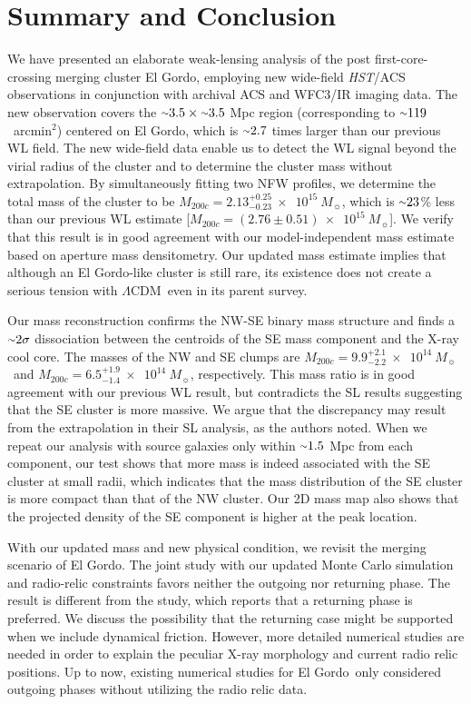 \documentclass[twocolumn]{aastex631}
\newcommand{\elgordo}{El Gordo}
\newcommand{\LCDM}{$\Lambda$CDM}
\newcommand{\HST}{{\it HST}}
\newcommand{\mytilde}{\raise.19ex\hbox{$\scriptstyle\sim$}}
\newcommand{\solarm}{$10^{14}~M_{\sun}$}
\newcommand{\solarmA}{$10^{15}~M_{\sun}$}
\newcommand{\sqarcmin}{arcmin$^{2}$}
\begin{document}
\section{Summary and Conclusion} \label{section_summary}
We have presented an elaborate weak-lensing analysis of the post first-core-crossing merging cluster \elgordo, employing new wide-field \HST/ACS observations in conjunction with archival ACS and WFC3/IR imaging data. 
The new observation covers the $\mytilde3.5\times\mytilde3.5$ Mpc region (corresponding to $\mytilde119$~\sqarcmin) centered on \elgordo, which is $\mytilde2.7$ times larger than our previous WL field. 
The new wide-field data enable us to detect the WL signal beyond the virial radius of the cluster and to determine the cluster mass without extrapolation.
By simultaneously fitting two NFW profiles, we determine the total mass of the cluster to be $M_{200c} = 2.13^{+0.25}_{-0.23}~\times$~\solarmA, which is $\mytilde23$\% less than our previous WL estimate [$M_{200c} = (2.76\pm0.51)~\times$~\solarmA]. 
We verify that this result is in good agreement with our model-independent mass estimate based on aperture mass densitometry. Our updated mass estimate implies that although an \elgordo-like cluster is still rare, its existence does not create a serious tension with \LCDM~even in its parent survey.


Our mass reconstruction confirms the NW-SE binary mass structure and finds a $\mytilde2\sigma$ dissociation between the centroids of the SE mass component and the X-ray cool core. 
The masses of the NW and SE clumps are $M_{200c} = 9.9^{+2.1}_{-2.2}~\times$~\solarm~and $M_{200c} = 6.5^{+1.9}_{-1.4}~\times$~\solarm, respectively. 
This mass ratio is in good agreement with our previous WL result, but contradicts the SL results suggesting that the SE cluster is more massive. We argue that the discrepancy may result from the extrapolation in their SL analysis, as the authors noted. 
When we repeat our analysis with source galaxies only within $\mytilde1.5$ Mpc from each component, our test shows that more mass is indeed associated with the SE cluster at small radii, which indicates that the mass distribution of the SE cluster is more compact than that of the NW cluster. 
Our 2D mass map also shows that the projected density of the SE component is higher at the peak location.


With our updated mass and new physical condition, we revisit the merging scenario of \elgordo. 
The joint study with our updated Monte Carlo simulation and radio-relic constraints favors neither the outgoing nor returning phase. The result is different from the \cite{Ng2015} study, which reports that a returning phase is preferred. We discuss the possibility that the returning case might be supported when we include dynamical friction.
However, more detailed numerical studies are needed in order to explain the peculiar X-ray morphology and current radio relic positions. 
Up to now, existing numerical studies for \elgordo~only considered outgoing phases without utilizing the radio relic data.
\end{document}
